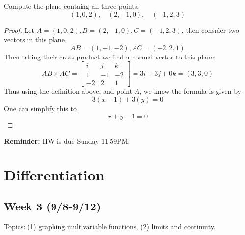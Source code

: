 \documentclass[openany]{book}
\begin{document}
\begin{prob}
    Compute the plane containg all three points:
    \begin{equation*}
        (1,0,2), \quad (2, -1, 0), \quad (-1, 2, 3)
    \end{equation*}
\end{prob}
\begin{proof}
    Let $A=(1,0,2), B=(2, -1, 0), C=(-1, 2, 3)$, then consider two vectors in this plane 
    \begin{equation*}
        AB=(1,-1,-2), AC=(-2,2,1)
    \end{equation*}
    Then taking their cross product we find a normal vector to this plane:
    \begin{equation*}
        AB\times AC=\begin{bmatrix}
            i&j&k\\
            1&-1&-2\\
            -2&2&1
        \end{bmatrix}=3i+3j+0k=(3,3,0)
    \end{equation*}
    Thus using the definition above, and point $A$, we know the formula is given by 
    \begin{equation*}
        3(x-1)+3(y)=0
    \end{equation*}
    One can simplify this to 
    \begin{equation*}
        x+y-1=0
    \end{equation*}
\end{proof}

\noindent
\textbf{Reminder:}
HW is due Sunday 11:59PM.







\chapter{Differentiation}
\section*{\centering Week 3 (9/8-9/12)}

\renewcommand\thesection{\arabic{section}}

\noindent
Topics: (1) graphing multivariable functions, (2) limits and continuity.
\end{document}
